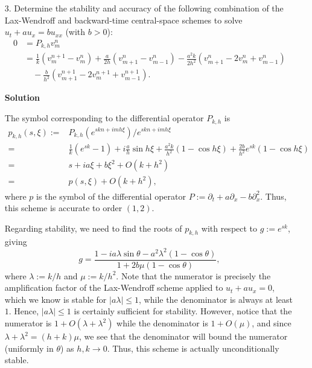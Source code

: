 \documentclass{article}
\providecommand{\abs}[1]{\left\lvert#1\right\rvert}
\begin{document}
\begin{itemize}
\item[3.] Determine the stability and accuracy of the following combination of the Lax-Wendroff and backward-time central-space schemes to solve $u_t + a u_x = b u_{xx}$ (with $b > 0$):
\begin{align*}
0 & = P_{k,h} v^n_m \\
  & = \frac{1}{k} \left( v^{n+1}_m - v^n_m \right) + \frac{a}{2h} \left( v^n_{m+1} - v^n_{m-1} \right) - \frac{a^2k}{2h^2} \left( v^n_{m+1} - 2 v^n_m + v^n_{m-1} \right) \\
  & \quad {} - \frac{b}{h^2} \left( v^{n+1}_{m+1} - 2 v^{n+1}_m + v^{n+1}_{m-1} \right).
\end{align*}

\textbf{Solution}

The symbol corresponding to the differential operator $P_{k,h}$ is
\begin{align*}
p_{k,h}(s,\xi) := {} & P_{k,h} \left( e^{skn + imh\xi} \right) / e^{skn + imh\xi} \\
                = {} & \frac{1}{k} \left( e^{sk} - 1 \right) + i \frac{a}{h} \sin h\xi + \frac{a^2k}{h^2} \left( 1 - \cos h\xi \right) + \frac{2b}{h^2} e^{sk} \left( 1 - \cos h\xi \right) \\
                = {} & s + ia\xi + b \xi^2 + O \left( k + h^2 \right) \\
                = {} & p(s,\xi) + O \left( k + h^2 \right),
\end{align*}
where $p$ is the symbol of the differential operator $P := \partial_t + a \partial_x - b \partial_x^2$. Thus, this scheme is accurate to order $(1,2)$.

Regarding stability, we need to find the roots of $p_{k,h}$ with respect to $g := e^{sk}$, giving
\begin{equation*}
g = \frac{1 - i a \lambda \sin \theta  - a^2 \lambda^2 \left( 1 - \cos \theta \right)}{1 + 2 b \mu \left( 1 - \cos \theta \right)},
\end{equation*}
where $\lambda := k/h$ and $\mu := k/h^2$. Note that the numerator is precisely the amplification factor of the Lax-Wendroff scheme applied to $u_t + a u_x = 0$, which we know is stable for $\abs{a\lambda} \leq 1$, while the denominator is always at least $1$. Hence, $\abs{a\lambda} \leq 1$ is certainly sufficient for stability. However, notice that the numerator is $1 + O \left( \lambda + \lambda^2 \right)$ while the denominator is $1 + O \left( \mu \right)$, and since $\lambda + \lambda^2 = (h + k) \mu$, we see that the denominator will bound the numerator (uniformly in $\theta$) as $h,k \to 0$. Thus, this scheme is actually unconditionally stable.

\end{itemize}
\end{document}
